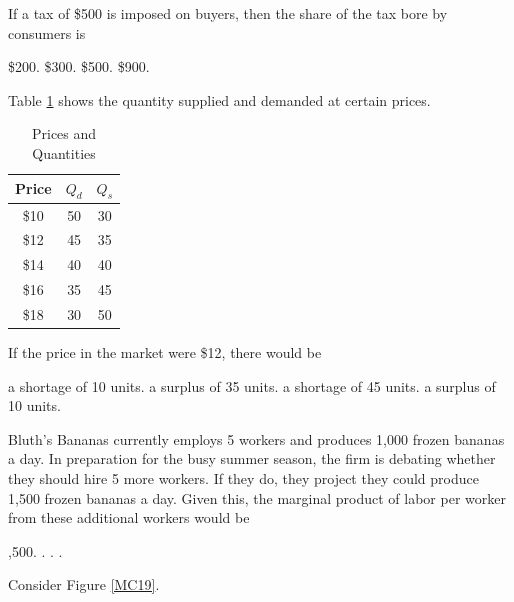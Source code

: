 \documentclass[addpoints,11pt]{exam}
\theoremstyle{definition}
\begin{document}
\begin{questions}
If a tax of \$500 is imposed on buyers, then the share of the tax bore by consumers is

	\begin{choices}
			\choice \$200.
			\CorrectChoice \$300.
			\choice \$500.
			\choice \$900.
	\end{choices}
	

	
	\question Table \ref{MC17} shows the quantity supplied and demanded at certain prices.
	
	
	\begin{table}[h!]
		\caption{Prices and Quantities}
		\centering
		\begin{tabular}{  c | c | c} 
			
			Price & $Q_d$ & $Q_s$ \\
			\hline
			\$10 & 50 & 30 \\
			\$12 & 45 & 35 \\
			\$14 & 40 & 40 \\
			\$16 & 35 & 45 \\
			\$18 & 30 & 50 \\
		\end{tabular}
		\label{MC17}
	\end{table}
	
\newpage
	
	If the price in the market were \$12, there would be
	
	\begin{choices}
			\CorrectChoice a shortage of 10 units.
			\choice a surplus of 35 units.
			\choice a shortage of 45 units.
			\choice a surplus of 10 units.
	\end{choices}
	


	\question Bluth's Bananas currently employs 5 workers and produces 1,000 frozen bananas a day. In preparation for the busy summer season, the firm is debating whether they should hire 5 more workers. If they do, they project they could produce 1,500 frozen bananas a day. Given this, the marginal product of labor per worker from these additional workers would be
	
	
	\begin{choices}
			\choice 1,500.
			\choice 500.
			\choice 150.
			\CorrectChoice 100.
	\end{choices}
	

	
	\question Consider Figure \ref{MC19}. 
	

\end{questions}
\end{document}
